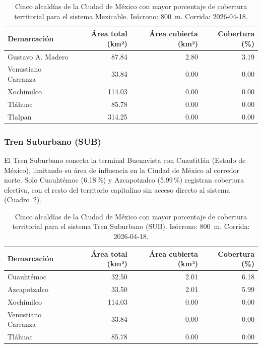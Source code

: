 \begin{table}[H]
    \centering
    \caption[Alcaldías con mayor cobertura de Mexicable (CDMX)]{
    Cinco alcaldías de la Ciudad de México con mayor porcentaje de cobertura
    territorial para el sistema Mexicable. Isócrono: 800~m.
    Corrida: 2026-04-18.}
    \label{tab:cobertura-mexicable-cdmx}
    \begin{tabular}{|l|r|r|r|}
        \hline
        \textbf{Demarcación} & \textbf{Área total (km²)} & \textbf{Área cubierta (km²)} & \textbf{Cobertura (\%)} \\
        \hline
        Gustavo A. Madero   &  87.84 & 2.80 & 3.19 \\
        Venustiano Carranza &  33.84 & 0.00 & 0.00 \\
        Xochimilco          & 114.03 & 0.00 & 0.00 \\
        Tláhuac             &  85.78 & 0.00 & 0.00 \\
        Tlalpan             & 314.25 & 0.00 & 0.00 \\
        \hline
    \end{tabular}
\end{table}

\subsubsection{Tren Suburbano (SUB)}
\label{subsubsec:cobertura-sub}

El Tren Suburbano conecta la terminal Buenavista con Cuautitlán (Estado de
México), limitando su área de influencia en la Ciudad de México al corredor norte.
Solo Cuauhtémoc (6.18\,\%) y Azcapotzalco (5.99\,\%) registran cobertura
efectiva, con el resto del territorio capitalino sin acceso directo al sistema
(Cuadro~\ref{tab:cobertura-sub-cdmx}).

\begin{table}[H]
    \centering
    \caption[Alcaldías con mayor cobertura de Tren Suburbano (CDMX)]{
    Cinco alcaldías de la Ciudad de México con mayor porcentaje de cobertura
    territorial para el sistema Tren Suburbano (SUB). Isócrono: 800~m.
    Corrida: 2026-04-18.}
    \label{tab:cobertura-sub-cdmx}
    \begin{tabular}{|l|r|r|r|}
        \hline
        \textbf{Demarcación} & \textbf{Área total (km²)} & \textbf{Área cubierta (km²)} & \textbf{Cobertura (\%)} \\
        \hline
        Cuauhtémoc          &  32.50 & 2.01 & 6.18 \\
        Azcapotzalco        &  33.50 & 2.01 & 5.99 \\
        Xochimilco          & 114.03 & 0.00 & 0.00 \\
        Venustiano Carranza &  33.84 & 0.00 & 0.00 \\
        Tláhuac             &  85.78 & 0.00 & 0.00 \\
        \hline
    \end{tabular}
\end{table}

